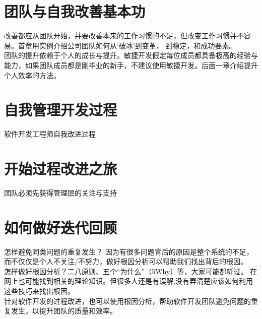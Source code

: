 \documentclass{book}        %
\begin{document}


\part{团队与自我改善基本功}改善都应从团队开始，并要改善本来的工作习惯的不足，但改变工作习惯并不容易。首章用实例介绍公司团队如何从‘破冰’到变革， 到稳定，和成功要素。 \\
团队的提升依赖于个人的成长与提升。敏捷开发假定每位成员都具备极高的经验与能力，如果团队成员都是刚毕业的新手，不建议使用敏捷开发。后面一章介绍提升个人效率的方法。\\




\part{自我管理开发过程}软件开发工程师自我改进过程\\









\part{开始过程改进之旅}团队必须先获得管理层的关注与支持\\





\part{如何做好迭代回顾}怎样避免同类问题的重复发生？ 因为有很多问题背后的原因是整个系统的不足， 而不仅仅是个人不关注/不努力，做好根因分析可以帮助我们找出背后的根因。\\

怎样做好根因分析？二八原则、五个“为什么”（5Why）等，大家可能都听过。 在网上也可能找到相关的理论知识。但很多人还是有误解,没有弄清楚应该如何利用这些技巧来找出根因。\\

针对软件开发的过程改进，也可以使用根因分析，帮助软件开发团队避免问题的重复发生，以提升团队的质量和效率。\\
\end{document}
